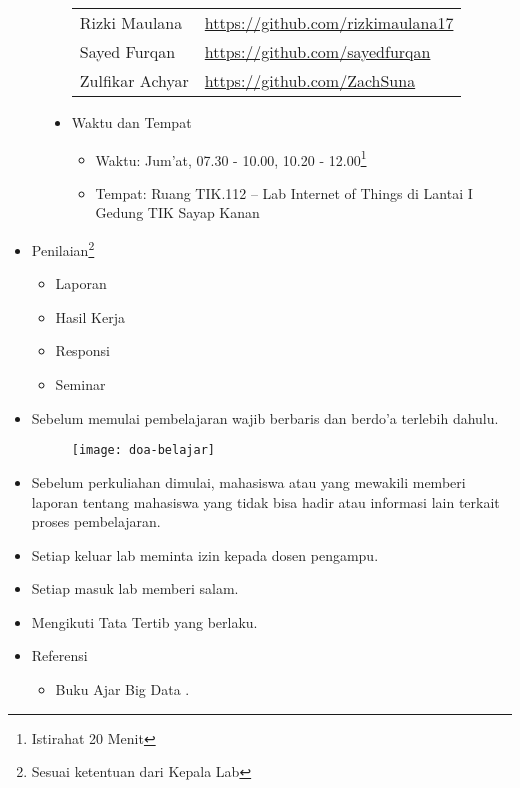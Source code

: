 \documentclass[a4paper]{tufte-handout}
\begin{document}
\begin{projects}
\begin{description}
\begin{itemize}
\begin{table}[!ht]
\begin{tabular}{ll}
Rizki Maulana			& \url{https://github.com/rizkimaulana17} \\
Sayed Furqan			& \url{https://github.com/sayedfurqan} \\
Zulfikar Achyar			& \url{https://github.com/ZachSuna} \\
\midrule
\end{tabular}
\end{table}
\item Waktu dan Tempat
\begin{itemize}
\item Waktu: Jum'at, 07.30 - 10.00, 10.20 - 12.00\footnote{Istirahat 20 Menit}
\item Tempat: Ruang TIK.112 -- Lab Internet of Things di Lantai I Gedung TIK Sayap Kanan
\end{itemize}
\end{itemize}
\end{description}
\end{projects}

\clearpage
\begin{maybe}
\begin{itemize}
\item Penilaian\footnote{Sesuai ketentuan dari Kepala Lab}
\begin{multicols}{2}
\begin{itemize}
\item Laporan
\item Hasil Kerja
\item Responsi
\item Seminar
\end{itemize}
\end{multicols}

\item Sebelum memulai pembelajaran wajib berbaris dan berdo'a terlebih dahulu.
\begin{figure}
\texttt{[image: doa-belajar]}
\end{figure}
\item Sebelum perkuliahan dimulai, mahasiswa atau yang mewakili memberi laporan tentang mahasiswa yang tidak bisa hadir atau informasi lain terkait proses pembelajaran.
\item Setiap keluar lab meminta izin kepada dosen pengampu.
\item Setiap masuk lab memberi salam.
\item Mengikuti Tata Tertib yang berlaku.
\item Referensi

\begin{itemize}
\item Buku Ajar Big Data \citep{Mursyidah2020}.
\end{itemize}
\end{itemize}
\end{maybe}
\end{document}
